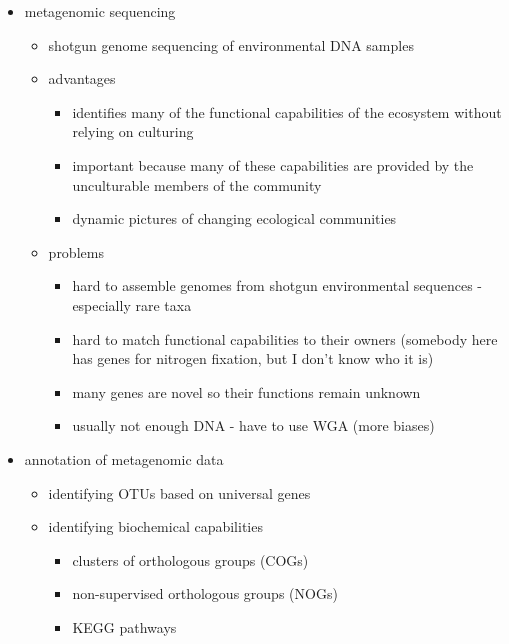 \documentclass{article}
\begin{document}
\begin{itemize}
\begin{itemize}
\begin{itemize}
            \end{itemize}
        \end{itemize}
        \item metagenomic sequencing
        \begin{itemize}
            \item shotgun genome sequencing of environmental DNA samples
            \item advantages
            \begin{itemize}
                \item identifies many of the functional capabilities of the ecosystem without relying on culturing
                \item important because many of these capabilities are provided by the unculturable members of the community
                \item dynamic pictures of changing ecological communities
            \end{itemize}
            \item problems
            \begin{itemize}
                \item hard to assemble genomes from shotgun environmental sequences - especially rare taxa
                \item hard to match functional capabilities to their owners (somebody here has genes for nitrogen fixation, but I don't know who it is)
                \item many genes are novel so their functions remain unknown
                \item usually not enough DNA - have to use WGA (more biases)
            \end{itemize}
        \end{itemize}
        \item annotation of metagenomic data
        \begin{itemize}
            \item identifying OTUs based on universal genes
            \item identifying biochemical capabilities
            \begin{itemize}
                \item clusters of orthologous groups (COGs)
                \item non-supervised orthologous groups (NOGs)
                \item KEGG pathways 
            \end{itemize}

\end{itemize}
\end{itemize}
\end{document}
